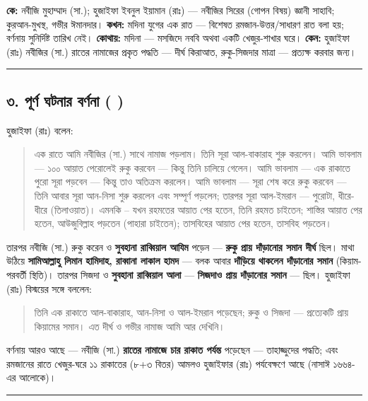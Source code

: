 \textbf{কে:} নবীজি মুহাম্মাদ (সা.); হুজাইফা ইবনুল ইয়ামান (রাঃ) — নবীজির সিরের (গোপন বিষয়) জ্ঞানী সাহাবি; কুরআন-মুখস্থ, গভীর ঈমানদার।
\textbf{কখন:} মদিনা যুগের এক রাত — বিশেষত রমজান-উত্তর/সাধারণ রাত বলা হয়; বর্ণনায় সুনির্দিষ্ট তারিখ নেই।
\textbf{কোথায়:} মদিনা — মসজিদে নববি অথবা একটি খেজুর-শাখার ঘরে।
\textbf{কেন:} হুজাইফা (রাঃ) নবীজির (সা.) রাতের নামাজের প্রকৃত পদ্ধতি — দীর্ঘ কিরাআত, রুকু-সিজদার মাত্রা — প্রত্যক্ষ করবার জন্য।

\medskip\hrule\medskip

\subsection*{৩. পূর্ণ ঘটনার বর্ণনা (  )}

হুজাইফা (রাঃ) বলেন:

\begin{quote}
এক রাতে আমি নবীজির (সা.) সাথে নামাজ পড়লাম। তিনি সূরা আল-বাকারাহ শুরু করলেন। আমি ভাবলাম — ১০০ আয়াত পেরোলেই রুকু করবেন — কিন্তু তিনি চালিয়ে গেলেন। আমি ভাবলাম — এক রাকাতে পুরো সূরা পড়বেন — কিন্তু তাও অতিক্রম করলেন। আমি ভাবলাম — সূরা শেষ করে রুকু করবেন — তিনি আবার সূরা আন-নিসা শুরু করলেন এবং সম্পূর্ণ পড়লেন; তারপর সূরা আল-ইমরান — পুরোটা, ধীরে-ধীরে (তিলাওয়াত)। এমনকি – যখন রহমতের আয়াত পের হতেন, তিনি রহমত চাইতেন; শাস্তির আয়াত পের হতেন, আউজুবিল্লাহ পড়তেন (পাহারা চাইতেন); তাসবিহের আয়াত পের হতেন, তাসবিহ পড়তেন।
\end{quote}

তারপর নবীজি (সা.) রুকু করেন ও \textbf{সুবহানা রাব্বিয়াল আযিম} পড়েন — \textbf{রুকু প্রায় দাঁড়ানোর সমান দীর্ঘ} ছিল। মাথা উঠিয়ে \textbf{সামিআল্লাহু লিমান হামিদাহ, রাব্বানা লাকাল হামদ} — বলক আবার \textbf{দাঁড়িয়ে থাকলেন দাঁড়ানোর সমান} (কিয়াম-পরবর্তী স্থিতি)। তারপর সিজদা ও \textbf{সুবহানা রাব্বিয়াল আলা} — \textbf{সিজদাও প্রায় দাঁড়ানোর সমান} — ছিল। হুজাইফা (রাঃ) বিস্ময়ের সঙ্গে বললেন:

\begin{quote}
তিনি এক রাকাতে আল-বাকারাহ, আন-নিসা ও আল-ইমরান পড়েছেন; রুকু ও সিজদা — প্রত্যেকটি প্রায় কিয়ামের সমান। এত দীর্ঘ ও গভীর নামাজ আমি আর দেখিনি।
\end{quote}

বর্ণনায় আরও আছে — নবীজি (সা.) \textbf{রাতের নামাজে চার রাকাত পর্যন্ত} পড়েছেন — তাহাজ্জুদের পদ্ধতি; এবং রমজানের রাতে খেজুর-ঘরে ১১ রাকাতের (৮+৩ বিতর) আমলও হুজাইফার (রাঃ) পর্যবেক্ষণে আছে (নাসাঈ ১৬৬৪-এর আলোকে)।

\medskip\hrule\medskip

